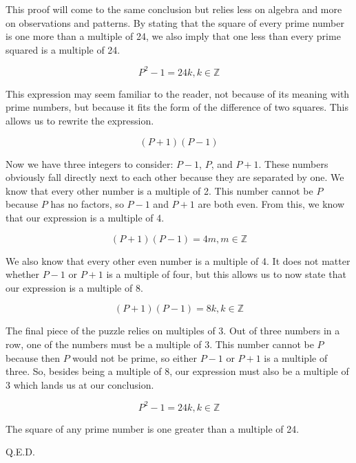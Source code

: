 This proof will come to the same conclusion but relies less on algebra and more on observations and patterns. By stating that the square of every prime number is one more than a multiple of 24, we also imply that one less than every prime squared is a multiple of 24.

\[P^2 - 1 = 24k, k \in \mathbb{Z}\]

This expression may seem familiar to the reader, not because of its meaning with prime numbers, but because it fits the form of the difference of two squares. This allows us to rewrite the expression.

\[(P + 1)(P - 1)\]

Now we have three integers to consider: \(P - 1\), \(P\), and \(P + 1\). These numbers obviously fall directly next to each other because they are separated by one. We know that every other number is a multiple of 2. This number cannot be \(P\) because \(P\) has no factors, so \(P - 1\) and \(P + 1\) are both even. From this, we know that our expression is a multiple of 4.

\[(P + 1)(P - 1) = 4m, m \in \mathbb{Z}\]

We also know that every other even number is a multiple of 4. It does not matter whether \(P - 1\) or \(P + 1\) is a multiple of four, but this allows us to now state that our expression is a multiple of 8. 

\[(P + 1)(P - 1) = 8k, k \in \mathbb{Z}\]

The final piece of the puzzle relies on multiples of 3. Out of three numbers in a row, one of the numbers must be a multiple of 3. This number cannot be \(P\) because then \(P\) would not be prime, so either \(P - 1\) or \(P + 1\) is a multiple of three. So, besides being a multiple of 8, our expression must also be a multiple of 3 which lands us at our conclusion.

\[P^2 - 1 = 24k, k \in \mathbb{Z}\]

The square of any prime number is one greater than a multiple of 24.

Q.E.D.
